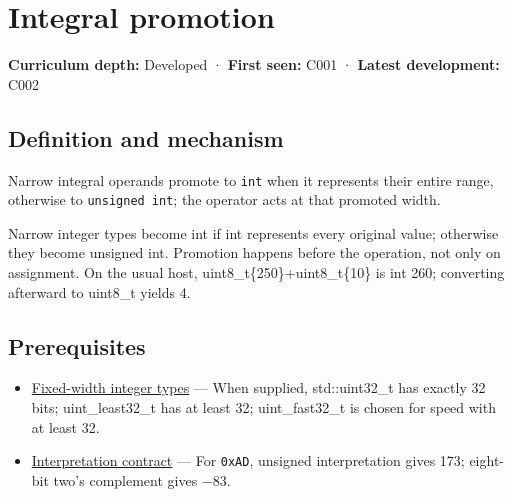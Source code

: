 \hypertarget{appendix-45303d03796a}{}\label{referencestart:appendix-45303d03796a}
\section{Integral promotion}\label{appendix-45303d03796a-integral-promotion}

\hypertarget{appendix-45303d03796a-integral-promotion}{}

\textbf{Curriculum depth:} Developed · \textbf{First seen:} C001 · \textbf{Latest development:} C002

\begin{allmightroledefinition}

\subsection{Definition and mechanism}\label{appendix-45303d03796a-definition-and-mechanism}

\hypertarget{appendix-45303d03796a-definition-and-mechanism}{}

Narrow integral operands promote to \texttt{int} when it represents their entire range, otherwise to \texttt{unsigned\ int}; the operator acts at that promoted width.

\end{allmightroledefinition}

Narrow integer types become int if int represents every original value; otherwise they become unsigned int. Promotion happens before the operation, not only on assignment. On the usual host, uint8\_t\{250\}+uint8\_t\{10\} is int 260; converting afterward to uint8\_t yields 4.

\subsection{Prerequisites}\label{appendix-45303d03796a-prerequisites}

\hypertarget{appendix-45303d03796a-prerequisites}{}

\begin{itemize}
\tightlist
\item
  \hyperref[appendix-cc04044b5782]{Fixed-width integer types} --- When supplied, std::uint32\_t has exactly 32 bits; uint\_least32\_t has at least 32; uint\_fast32\_t is chosen for speed with at least 32.
\item
  \hyperref[appendix-f414bd4ed05c]{Interpretation contract} --- For \texttt{0xAD}, unsigned interpretation gives 173; eight-bit two's complement gives −83.
\end{itemize}

